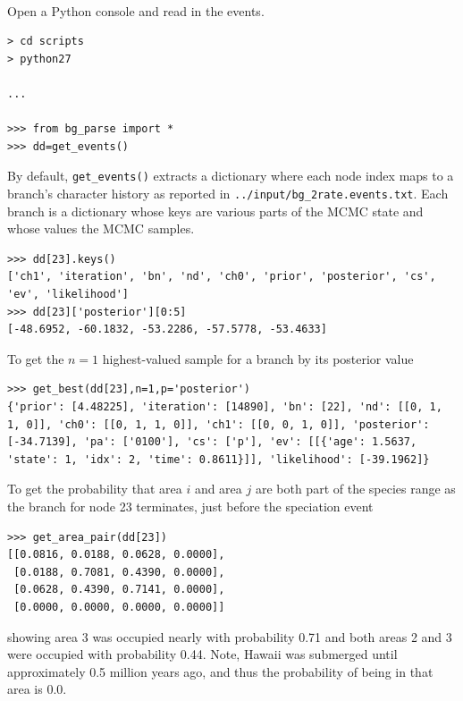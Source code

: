 \documentclass[11pt]{article}
\newcommand{\impmark}{\strut\vadjust{\domark}}
\newcommand{\domark}{%
  \vbox to 0pt{
    \kern-\dp\strutbox
    \smash{\llap{$\rightarrow$\kern1em}}
    \vss
  }%
}
\begin{document}
\noindent \\ \impmark  Open a Python console and read in the events.

\begin{snugshade}
\begin{lstlisting}
> cd scripts
> python27

...

>>> from bg_parse import *
>>> dd=get_events()
\end{lstlisting}
\end{snugshade}

By default, {\tt get\_events()} extracts a dictionary where each node index maps to a branch's character history as reported in {\tt ../input/bg\_2rate.events.txt}. 
Each branch is a dictionary whose keys are various parts of the MCMC state and whose values the MCMC samples.
\begin{snugshade}
\begin{lstlisting}
>>> dd[23].keys()
['ch1', 'iteration', 'bn', 'nd', 'ch0', 'prior', 'posterior', 'cs', 'ev', 'likelihood']
>>> dd[23]['posterior'][0:5]
[-48.6952, -60.1832, -53.2286, -57.5778, -53.4633]
\end{lstlisting}
\end{snugshade}

To get the $n=1$ highest-valued sample for a branch by its posterior value
\begin{snugshade}
\begin{lstlisting}
>>> get_best(dd[23],n=1,p='posterior')
{'prior': [4.48225], 'iteration': [14890], 'bn': [22], 'nd': [[0, 1, 1, 0]], 'ch0': [[0, 1, 1, 0]], 'ch1': [[0, 0, 1, 0]], 'posterior': [-34.7139], 'pa': ['0100'], 'cs': ['p'], 'ev': [[{'age': 1.5637, 'state': 1, 'idx': 2, 'time': 0.8611}]], 'likelihood': [-39.1962]}
\end{lstlisting}
\end{snugshade}

To get the probability that area $i$ and area $j$ are both part of the species range as the branch for node 23 terminates, just before the speciation event
\begin{snugshade}
\begin{lstlisting}
>>> get_area_pair(dd[23])
[[0.0816, 0.0188, 0.0628, 0.0000],
 [0.0188, 0.7081, 0.4390, 0.0000],
 [0.0628, 0.4390, 0.7141, 0.0000],
 [0.0000, 0.0000, 0.0000, 0.0000]]
\end{lstlisting}
\end{snugshade}
showing area 3 was occupied nearly with probability 0.71 and both areas 2 and 3 were occupied with probability 0.44.
Note, Hawaii was submerged until approximately 0.5 million years ago, and thus the probability of being in that area is 0.0.
\end{document}

